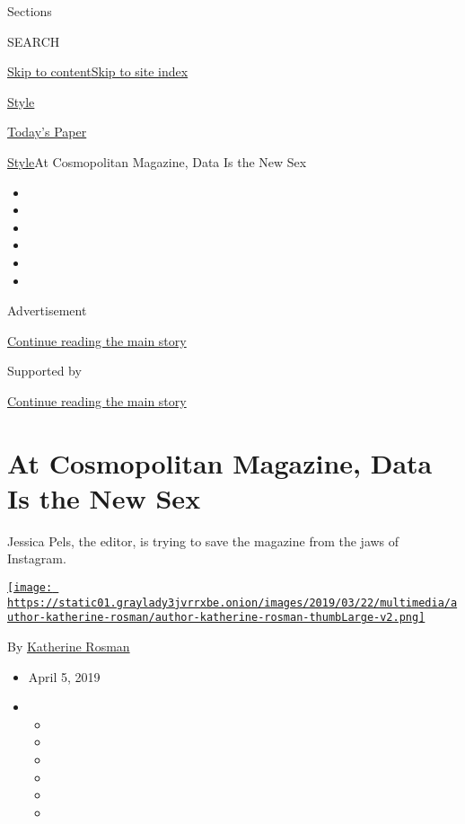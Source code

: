 Sections

SEARCH

\protect\hyperlink{site-content}{Skip to
content}\protect\hyperlink{site-index}{Skip to site index}

\href{https://www.nytimes3xbfgragh.onion/section/style}{Style}

\href{https://myaccount.nytimes3xbfgragh.onion/auth/login?response_type=cookie\&client_id=vi}{}

\href{https://www.nytimes3xbfgragh.onion/section/todayspaper}{Today's
Paper}

\href{/section/style}{Style}\textbar{}At Cosmopolitan Magazine, Data Is
the New Sex

\begin{itemize}
\item
\item
\item
\item
\item
\item
\end{itemize}

Advertisement

\protect\hyperlink{after-top}{Continue reading the main story}

Supported by

\protect\hyperlink{after-sponsor}{Continue reading the main story}

\hypertarget{at-cosmopolitan-magazine-data-is-the-new-sex}{%
\section{At Cosmopolitan Magazine, Data Is the New
Sex}\label{at-cosmopolitan-magazine-data-is-the-new-sex}}

Jessica Pels, the editor, is trying to save the magazine from the jaws
of Instagram.

\href{https://www.nytimes3xbfgragh.onion/by/katherine-rosman}{\texttt{[image: https://static01.graylady3jvrrxbe.onion/images/2019/03/22/multimedia/author-katherine-rosman/author-katherine-rosman-thumbLarge-v2.png]}}

By
\href{https://www.nytimes3xbfgragh.onion/by/katherine-rosman}{Katherine
Rosman}

\begin{itemize}
\item
  April 5, 2019
\item
  \begin{itemize}
  \item
  \item
  \item
  \item
  \item
  \item
  \end{itemize}
\end{itemize}

